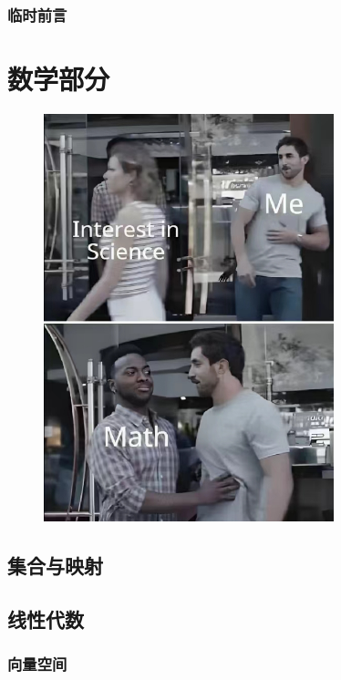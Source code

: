 \documentclass[zihao=-4,linespread=1.5,a4paper,heading=true,twoside]{ctexbook}
\theoremstyle{definition}
\theoremstyle{plain}
\begin{document}
\frontmatter
{}
\section*{临时前言}\label{sec:preface}


\tableofcontents
\mainmatter
{}
\part{数学部分}
\begin{figure}[p]
    \centering
    \includegraphics[width=0.75\textwidth]{images/math.jpg}
\end{figure}
\chapter{集合与映射}\label{sec:II.1}
\label{sec:II.1.1}
\label{sec:II.1.2}
\label{sec:II.1.3}

\chapter{线性代数}\label{sec:II.2}
\section{向量空间}\label{sec:II.2.1}

\end{document}
